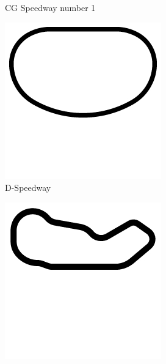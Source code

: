 \begin{figure}[t]
\begin{subfigure}[b]{0.16\textwidth}
       \caption{CG Speedway number 1}
   \end{subfigure}
\begin{subfigure}[b]{0.15\textwidth}
       \includegraphics[width=\textwidth]{img/tracks/D-Speedway}
       \caption{D-Speedway}
   \end{subfigure}
\begin{subfigure}[b]{0.15\textwidth}
       \includegraphics[width=\textwidth]{img/tracks/Dirt1}

\end{subfigure}
\end{figure}

